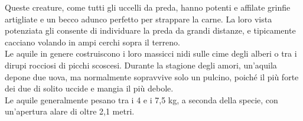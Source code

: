 \begin{multicols}{2}
Queste creature, come tutti gli uccelli da preda, hanno potenti e affilate grinfie artigliate e un becco adunco perfetto per strappare la carne. La loro vista potenziata gli consente di individuare la preda da grandi distanze, e tipicamente cacciano volando in ampi cerchi sopra il terreno.\\

Le aquile in genere costruiscono i loro massicci nidi sulle cime degli alberi o tra i dirupi rocciosi di picchi scoscesi. Durante la stagione degli amori, un’aquila depone due uova, ma normalmente sopravvive solo un pulcino, poiché il più forte dei due di solito uccide e mangia il più debole.\\

Le aquile generalmente pesano tra i 4 e i 7,5 kg, a seconda della specie, con un’apertura alare di oltre 2,1 metri.\\


\end{multicols}
